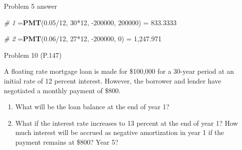 \documentclass[ignorenonframetext,]{beamer}
\newenvironment{Shaded}{\begin{snugshade}}{\end{snugshade}}
\newcommand{\KeywordTok}[1]{\textcolor[rgb]{0.13,0.29,0.53}{\textbf{{#1}}}}
\newcommand{\DecValTok}[1]{\textcolor[rgb]{0.00,0.00,0.81}{{#1}}}
\newcommand{\FloatTok}[1]{\textcolor[rgb]{0.00,0.00,0.81}{{#1}}}
\newcommand{\StringTok}[1]{\textcolor[rgb]{0.31,0.60,0.02}{{#1}}}
\newcommand{\CommentTok}[1]{\textcolor[rgb]{0.56,0.35,0.01}{\textit{{#1}}}}
\newcommand{\NormalTok}[1]{{#1}}
\providecommand{\tightlist}{%
\setlength{\itemsep}{0pt}\setlength{\parskip}{0pt}}
\begin{document}
\begin{frame}[fragile]{Problem 5 answer}

\begin{Shaded}
\begin{Highlighting}[]
\CommentTok{# 1}
\NormalTok{=}\KeywordTok{PMT}\NormalTok{(}\FloatTok{0.05}\NormalTok{/}\DecValTok{12}\NormalTok{, }\DecValTok{30}\NormalTok{*}\DecValTok{12}\NormalTok{, -}\DecValTok{200000}\NormalTok{, }\DecValTok{200000}\NormalTok{) =}\StringTok{ }\FloatTok{833.3333}

\CommentTok{# 2}
\NormalTok{=}\KeywordTok{PMT}\NormalTok{(}\FloatTok{0.06}\NormalTok{/}\DecValTok{12}\NormalTok{, }\DecValTok{27}\NormalTok{*}\DecValTok{12}\NormalTok{, -}\DecValTok{200000}\NormalTok{, }\DecValTok{0}\NormalTok{) =}\StringTok{ }\DecValTok{1}\NormalTok{,}\FloatTok{247.971}
\end{Highlighting}
\end{Shaded}

\normalsize

\end{frame}

\begin{frame}{Problem 10 (P.147)}

\small

A floating rate mortgage loan is made for \$100,000 for a 30-year period
at an initial rate of 12 percent interest. However, the borrower and
lender have negotiated a monthly payment of \$800.

\begin{enumerate}
\def\labelenumi{\alph{enumi}.}
\tightlist
\item
  What will be the loan balance at the end of year 1?
\item
  What if the interest rate increases to 13 percent at the end of year
  1? How much interest will be accrued as negative amortization in year
  1 if the payment remains at \$800? Year 5?
\end{enumerate}

\end{frame}
\end{document}

